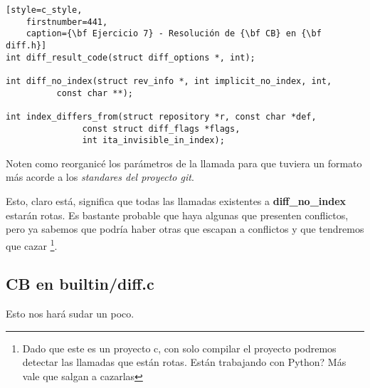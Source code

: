 \begin{lstlisting}[style=c_style,
	firstnumber=441,
	caption={\bf Ejercicio 7} - Resolución de {\bf CB} en {\bf diff.h}]
int diff_result_code(struct diff_options *, int);

int diff_no_index(struct rev_info *, int implicit_no_index, int,
		  const char **);

int index_differs_from(struct repository *r, const char *def,
		       const struct diff_flags *flags,
		       int ita_invisible_in_index);
\end{lstlisting}

Noten como reorganicé los parámetros de la llamada para que tuviera un formato más acorde a los {\it standares del proyecto git}.

Esto, claro está, significa que todas las llamadas existentes a {\bf diff\_no\_index} estarán rotas. Es bastante probable que haya
algunas que presenten conflictos, pero ya sabemos que podría haber otras que escapan a conflictos y que tendremos que cazar
\footnote{Dado que este es un proyecto c, con solo compilar el proyecto podremos detectar las llamadas que están rotas. Están
trabajando con Python? Más vale que salgan a cazarlas}.

\subsection*{CB en builtin/diff.c}

Esto nos hará sudar un poco.

